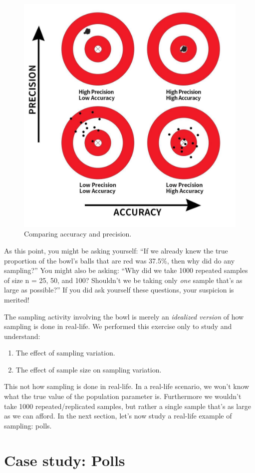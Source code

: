 \documentclass[
]{book}
\providecommand{\tightlist}{%
  \setlength{\itemsep}{0pt}\setlength{\parskip}{0pt}}
\begin{document}
\begin{figure}
\includegraphics[width=0.5\linewidth]{images/accuracy_vs_precision} \caption{Comparing accuracy and precision.}\label{fig:accuracy-vs-precision}
\end{figure}

As this point, you might be asking yourself: ``If we already knew the true proportion of the bowl's balls that are red was 37.5\%, then why did do any sampling?'' You might also be asking: ``Why did we take 1000 repeated samples of size n = 25, 50, and 100? Shouldn't we be taking only \emph{one} sample that's as large as possible?'' If you did ask yourself these questions, your suspicion is merited!

The sampling activity involving the bowl is merely an \emph{idealized version} of how sampling is done in real-life. We performed this exercise only to study and understand:

\begin{enumerate}
\def\labelenumi{\arabic{enumi}.}
\tightlist
\item
  The effect of sampling variation.
\item
  The effect of sample size on sampling variation.
\end{enumerate}

This not how sampling is done in real-life. In a real-life scenario, we won't know what the true value of the population parameter is. Furthermore we wouldn't take 1000 repeated/replicated samples, but rather a single sample that's as large as we can afford. In the next section, let's now study a real-life example of sampling: polls.

\hypertarget{sampling-case-study}{%
\section{Case study: Polls}\label{sampling-case-study}}
\end{document}
